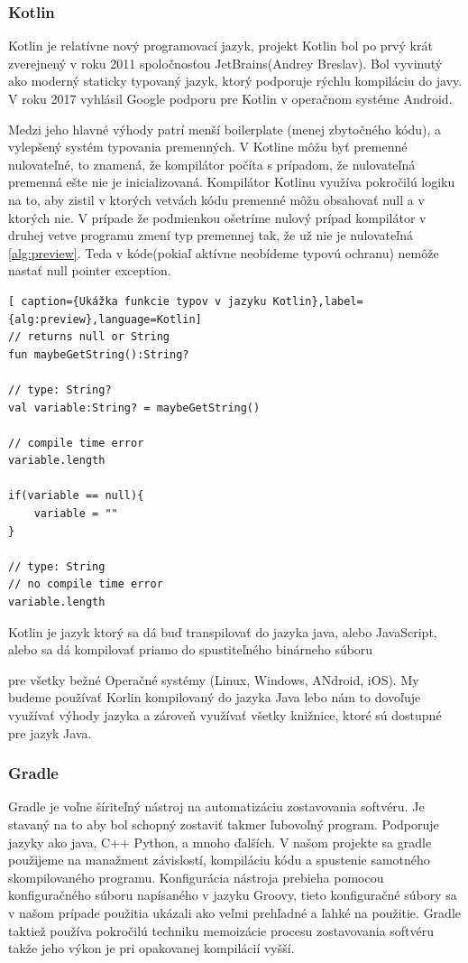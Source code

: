 \subsubsection{Kotlin}  
Kotlin je relatívne nový programovací jazyk, projekt Kotlin bol po prvý krát zverejnený v roku 2011 spoločnosťou JetBrains(Andrey Breslav). Bol vyvinutý ako moderný staticky typovaný jazyk, ktorý podporuje rýchlu kompiláciu do javy. V roku 2017 vyhlásil Google podporu pre Kotlin v operačnom systéme Android.   

Medzi jeho hlavné výhody patrí menší boilerplate (menej zbytočného kódu), a vylepšený systém typovania premenných. V Kotline  môžu byť premenné nulovateľné, to znamená, že kompilátor počíta s prípadom, že nulovateľná premenná ešte nie je inicializovaná. Kompilátor Kotlinu využíva pokročilú logiku na to, aby zistil v ktorých vetvách kódu premenné môžu obsahovať null a v ktorých nie. V prípade že podmienkou ošetríme nulový prípad kompilátor v druhej vetve programu zmení typ premennej tak, že už nie je nulovateľná \ref{alg:preview}. Teda v kóde(pokiaľ aktívne neobídeme typovú ochranu) nemôže nastať null pointer exception. 

\begin{lstlisting}[ caption={Ukážka funkcie typov v jazyku Kotlin},label={alg:preview},language=Kotlin] 
// returns null or String 
fun maybeGetString():String? 

// type: String? 
val variable:String? = maybeGetString() 

// compile time error 
variable.length 

if(variable == null){ 
	variable = "" 
} 

// type: String
// no compile time error
variable.length  
\end{lstlisting} 


Kotlin je jazyk ktorý sa dá buď transpilovať do jazyka java, alebo JavaScript, alebo sa dá kompilovať priamo do spustiteľného  binárneho súboru 

pre všetky bežné Operačné systémy (Linux, Windows, ANdroid, iOS). My budeme používať Korlin kompilovaný do jazyka Java lebo nám to dovoľuje využívať výhody jazyka a zároveň využívať všetky knižnice, ktoré sú dostupné pre jazyk Java. 

\subsubsection{Gradle}  
Gradle je voľne šíriteľný nástroj na automatizáciu zostavovania softvéru. Je stavaný na to aby bol schopný zostaviť takmer ľubovoľný program. Podporuje jazyky ako java, C++ Python, a mnoho ďalších. V našom projekte sa gradle použijeme na manažment závislostí, kompiláciu kódu a spustenie samotného skompilovaného programu. Konfigurácia nástroja prebieha pomocou konfiguračného súboru napísaného v jazyku Groovy, tieto konfiguračné  súbory sa v našom prípade použitia ukázali ako veľmi prehľadné a ľahké na použitie. Gradle taktiež používa pokročilú techniku memoizácie procesu zostavovania softvéru takže jeho výkon je pri opakovanej kompilácií vyšší. 


